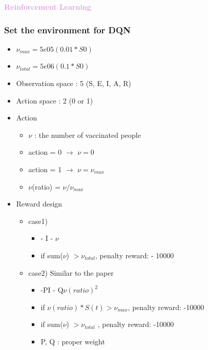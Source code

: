 \documentclass[usenames,dvipsnames, aspectratio=169, 9pt]{beamer}
\begin{document}
\begin{frame}
\centering
\textcolor{Plum}{\textbf{Reinforcement Learning}}
\end{frame}

\begin{frame}\frametitle{Set the environment for DQN}
\begin{itemize}
    \item $\nu_{max} = 5e05 (0.01 * S0) $
    \item $\nu_{total} = 5e06 (0.1 * S0)$
    \item Observation space : 5 (S, E, I, A, R)
    \item Action space : 2 (0 or 1)
    \item Action
    \begin{itemize}
            \item $\nu$ : the number of vaccinated people
            \item action = 0 $\rightarrow$ $\nu = 0$
            \item action = 1 $\rightarrow$ $\nu = \nu_{max}$
            \item $\nu$(ratio) = $\nu/\nu_{max}$
    \end{itemize}
    \item Reward design
        \begin{itemize}
            \item case1)
                \begin{itemize}
                    \item - I - $\nu$
                    \item if sum($\nu$) $> \nu_{total}$, penalty reward: - 10000
                \end{itemize}
            \item case2) Similar to the paper
                \begin{itemize}
                    \item -PI - Q$\nu(ratio)^2$  
                    \item if $\nu(ratio)*S(t) > \nu_{max}$,  penalty reward: -10000
                    \item if sum($\nu$) $> \nu_{total}$ , penalty reward: -10000
                    \item P, Q : proper weight
                \end{itemize}
        \end{itemize}
\end{itemize}
\end{frame}
\end{document}
